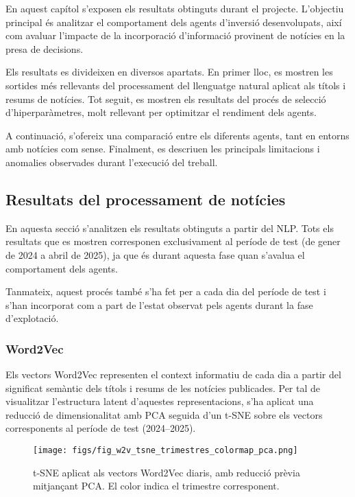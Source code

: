 \documentclass[12pt,a4paper,twoside]{book}
\begin{document}
En aquest capítol s'exposen els resultats obtinguts durant el projecte. L'objectiu principal és analitzar el comportament dels agents d'inversió desenvolupats, així com avaluar l'impacte de la incorporació d'informació provinent de notícies en la presa de decisions.

Els resultats es divideixen en diversos apartats. En primer lloc, es mostren les sortides més rellevants del processament del llenguatge natural aplicat als títols i resums de notícies. Tot seguit, es mostren els resultats del procés de selecció d'hiperparàmetres, molt rellevant per optimitzar el rendiment dels agents.

A continuació, s'ofereix una comparació entre els diferents agents, tant en entorns amb notícies com sense. Finalment, es descriuen les principals limitacions i anomalies observades durant l'execució del treball.


\subsection{Resultats del processament de notícies}
En aquesta secció s’analitzen els resultats obtinguts a partir del NLP. Tots els resultats que es mostren corresponen exclusivament al període de test (de gener de 2024 a abril de 2025), ja que és durant aquesta fase quan s’avalua el comportament dels agents.

Tanmateix, aquest procés també s'ha fet per a cada dia del període de test i s’han incorporat com a part de l’estat observat pels agents durant la fase d’explotació.

\subsubsection{Word2Vec}
Els vectors Word2Vec representen el context informatiu de cada dia a partir del significat semàntic dels títols i resums de les notícies publicades. Per tal de visualitzar l’estructura latent d’aquestes representacions, s’ha aplicat una reducció de dimensionalitat amb PCA seguida d’un t-SNE sobre els vectors corresponents al període de test (2024–2025).

\begin{figure}[H]
	\centering
	\texttt{[image: figs/fig\_w2v\_tsne\_trimestres\_colormap\_pca.png]}
	\caption{t-SNE aplicat als vectors Word2Vec diaris, amb reducció prèvia mitjançant PCA. El color indica el trimestre corresponent.}
	\label{fig:lda-evol}
\end{figure}
\end{document}
